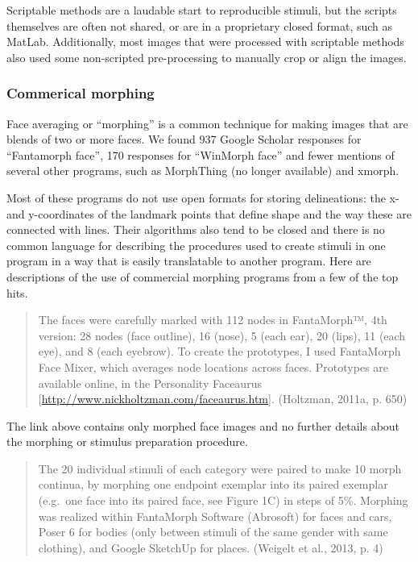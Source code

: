 \documentclass[
  man,floatsintext]{apa6}
\begin{document}
Scriptable methods are a laudable start to reproducible stimuli, but the scripts themselves are often not shared, or are in a proprietary closed format, such as MatLab. Additionally, most images that were processed with scriptable methods also used some non-scripted pre-processing to manually crop or align the images.

\hypertarget{commerical-morphing}{%
\subsubsection{Commerical morphing}\label{commerical-morphing}}

Face averaging or ``morphing'' is a common technique for making images that are blends of two or more faces. We found 937 Google Scholar responses for ``Fantamorph face'', 170 responses for ``WinMorph face'' and fewer mentions of several other programs, such as MorphThing (no longer available) and xmorph.

Most of these programs do not use open formats for storing delineations: the x- and y-coordinates of the landmark points that define shape and the way these are connected with lines. Their algorithms also tend to be closed and there is no common language for describing the procedures used to create stimuli in one program in a way that is easily translatable to another program. Here are descriptions of the use of commercial morphing programs from a few of the top hits.

\begin{quote}
The faces were carefully marked with 112 nodes in FantaMorph™, 4th version: 28 nodes (face outline), 16 (nose), 5 (each ear), 20 (lips), 11 (each eye), and 8 (each eyebrow). To create the prototypes, I used FantaMorph Face Mixer, which averages node locations across faces. Prototypes are available online, in the Personality Faceaurus {[}\url{http://www.nickholtzman.com/faceaurus.htm}{]}. (Holtzman, 2011a, p. 650)
\end{quote}

The link above contains only morphed face images and no further details about the morphing or stimulus preparation procedure.

\begin{quote}
The 20 individual stimuli of each category were paired to make 10 morph continua, by morphing one endpoint exemplar into its paired exemplar (e.g.~one face into its paired face, see Figure 1C) in steps of 5\%. Morphing was realized within FantaMorph Software (Abrosoft) for faces and cars, Poser 6 for bodies (only between stimuli of the same gender with same clothing), and Google SketchUp for places. (Weigelt et al., 2013, p. 4)
\end{quote}
\end{document}
